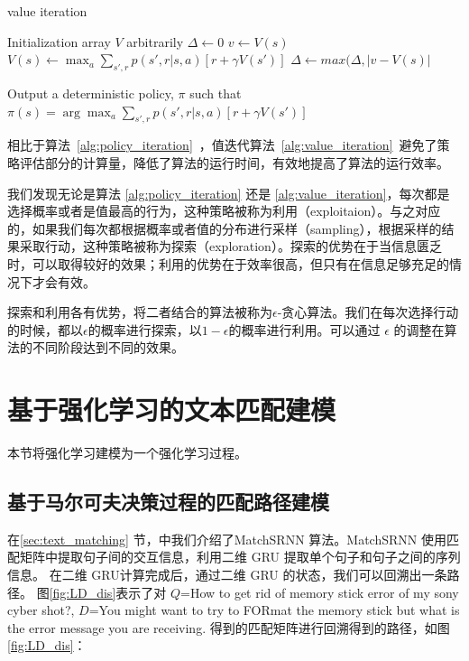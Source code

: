 \begin{algorithm}[!htbp]
    \small
    \caption{value iteration}\label{alg:value_iteration}
    \begin{algorithmic}
        \STATE Initialization array $V$ arbitrarily
        \REPEAT
        \STATE $\Delta \leftarrow 0$
        \STATE $v \leftarrow V(s)$
        \STATE $V(s)\leftarrow \max_a\sum_{s', r} p(s', r|s, a)[r + \gamma V(s')]$
        \STATE $\Delta \leftarrow max(\Delta, |v-V(s)|$
        \ENDFOR
        \UNTIL {$\Delta < \theta$}

        \STATE Output a deterministic policy, $\pi$ such that
        \STATE $\pi(s) = \arg\max_a\sum_{s', r} p(s', r|s, a)[r + \gamma V(s')]$
    \end{algorithmic}
\end{algorithm}



相比于算法~\ref{alg:policy_iteration}~，值迭代算法~\ref{alg:value_iteration}~避免了策略评估部分的计算量，降低了算法的运行时间，有效地提高了算法的运行效率。

我们发现无论是算法 \ref{alg:policy_iteration} 还是 \ref{alg:value_iteration}，每次都是选择概率或者是值最高的行为，这种策略被称为利用（exploitaion）。与之对应的，如果我们每次都根据概率或者值的分布进行采样（sampling），根据采样的结果采取行动，这种策略被称为探索（exploration）。探索的优势在于当信息匮乏时，可以取得较好的效果；利用的优势在于效率很高，但只有在信息足够充足的情况下才会有效。

探索和利用各有优势，将二者结合的算法被称为$\epsilon$-贪心算法。我们在每次选择行动的时候，都以$\epsilon$的概率进行探索，以$1-\epsilon$的概率进行利用。可以通过 $\epsilon$ 的调整在算法的不同阶段达到不同的效果。


\section{基于强化学习的文本匹配建模}
\label{sec:TM_MDP}
本节将强化学习建模为一个强化学习过程。

\subsection{基于马尔可夫决策过程的匹配路径建模}

在\ref{sec:text_matching} 节，中我们介绍了MatchSRNN\cite{Wan2016MatchSRNNMT} 算法。MatchSRNN 使用匹配矩阵中提取句子间的交互信息，利用二维 GRU 提取单个句子和句子之间的序列信息。 在二维 GRU计算完成后，通过二维 GRU 的状态，我们可以回溯出一条路径。
图\ref{fig:LD_dis}表示了对 $Q$=How to get rid of memory stick error of my sony cyber shot?, $D$=You might want to try to FORmat the memory
stick but what is the error message you are receiving. 得到的匹配矩阵进行回溯得到的路径，如图\ref{fig:LD_dis}：

